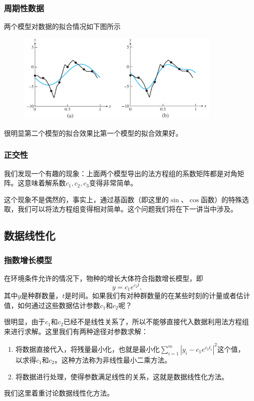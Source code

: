 \documentclass[10pt]{beamer}
\begin{document}
\begin{frame}
\frametitle{周期性数据}
两个模型对数据的拟合情况如下图所示
\begin{figure}
\includegraphics[width=10cm]{figs/4-2-1_Perriodic_Data-5} 
\end{figure}
很明显第二个模型的拟合效果比第一个模型的拟合效果好。
\end{frame}


\begin{frame}
\frametitle{正交性}
我们发现一个有趣的现象：上面两个模型导出的法方程组的系数矩阵都是对角矩阵。这意味着解系数$c_1, c_2, c_3$变得非常简单。

\vspace{0.2cm}

这个现象不是偶然的，事实上，通过基函数（即这里的$\sin$、$\cos$函数）的特殊选取，我们可以将法方程组变得相对简单。这个问题我们将在下一讲当中涉及。
\end{frame}


\subsection{数据线性化}

\begin{frame}
\frametitle{指数增长模型}
在环境条件允许的情况下，物种的增长大体符合指数增长模型，即
\begin{equation}
\label{eq: exponential growth}
y = c_1 e^{c_2 t},
\end{equation}
其中$y$是种群数量，$t$是时间。如果我们有对种群数量的在某些时刻的计量或者估计值，如何通过这些数据估计参数$c_1$和$c_2$呢？

\vspace{0.2cm}

很明显，由于$c_1$和$c_2$已经不是线性关系了，所以不能够直接代入数据利用法方程组来进行求解。这里我们有两种途径对参数求解：
\begin{enumerate}
\item 将数据直接代入，将残量最小化，也就是最小化$\sum_{i = 1}^{m} |y_i - c_1 e^{c_2 t_i}|^2$这个值，以求得$c_1$和$c_2$。这种方法称为非线性最小二乘方法。
\item 将数据进行处理，使得参数满足线性的关系，这就是数据线性化方法。
\end{enumerate}

我们这里着重讨论数据线性化方法。
\end{frame}
\end{document}
